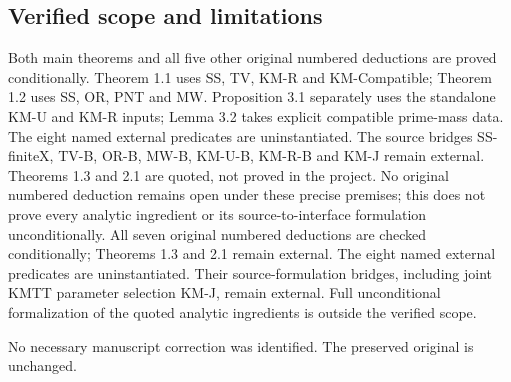 \subsection*{Verified scope and limitations}
\ifDetailed
Both main theorems and all five other original numbered deductions are proved conditionally. Theorem 1.1 uses SS, TV, KM-R and KM-Compatible; Theorem 1.2 uses SS, OR, PNT and MW. Proposition 3.1 separately uses the standalone KM-U and KM-R inputs; Lemma 3.2 takes explicit compatible prime-mass data. The eight named external predicates are uninstantiated. The source bridges SS-finiteX, TV-B, OR-B, MW-B, KM-U-B, KM-R-B and KM-J remain external. Theorems 1.3 and 2.1 are quoted, not proved in the project. No original numbered deduction remains open under these precise premises; this does not prove every analytic ingredient or its source-to-interface formulation unconditionally.
\else
All seven original numbered deductions are checked conditionally; Theorems 1.3 and 2.1 remain external. The eight named external predicates are uninstantiated. Their source-formulation bridges, including joint KMTT parameter selection KM-J, remain external. Full unconditional formalization of the quoted analytic ingredients is outside the verified scope.
\fi

\ifDetailed No necessary manuscript correction was identified. The preserved original is unchanged.\fi
